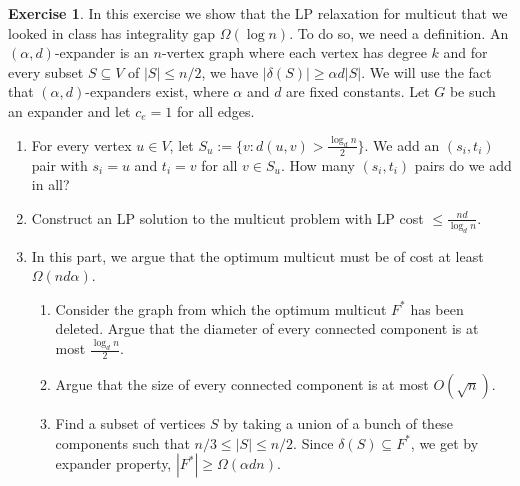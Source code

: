 \documentclass[11pt]{article}
\theoremstyle{definition}
\newtheorem{exercise}{Exercise}
\begin{document}
\begin{exercise}
In this exercise we show that the LP relaxation for multicut that we looked in class has integrality gap $\Omega(\log n)$.
To do so, we need a definition. An $(\alpha,d)$-expander is an $n$-vertex graph where each vertex has degree $k$ and for every subset $S\subseteq V$ of $|S|\leq n/2$, we have $|\delta(S)| \geq \alpha d |S|$. We will use the fact that $(\alpha,d)$-expanders exist, where $\alpha$ and $d$ are fixed constants. Let $G$ be such an expander and let $c_e = 1$ for all edges.

\begin{enumerate}
\item For every vertex $u\in V$, let $S_u := \{v: d(u,v) > \frac{\log_d n}{2}\}$. We add an $(s_i,t_i)$ pair with $s_i = u$ and $t_i = v$ for all $v \in S_u$. How many $(s_i,t_i)$ pairs do we add in all?
\item Construct an LP solution to the multicut problem with LP cost  $\leq \frac{nd}{\log_d n}$.
\item In this part, we argue that the optimum multicut must be of cost at least $\Omega(nd\alpha)$. 
\begin{enumerate}
\item Consider the graph from which the optimum multicut $F^*$ has been deleted. 
Argue that the diameter of every connected component is at most $\frac{\log_d n}{2}$.
\item Argue that the size of every connected component is at most $O(\sqrt{n})$.
\item Find a subset of vertices $S$ by taking a union of a bunch of these components such that
$n/3 \leq |S|\leq n/2$. Since $\delta(S) \subseteq F^*$, we get by expander property, $|F^*| \geq \Omega(\alpha d n)$.
\end{enumerate}


\end{enumerate}
\end{exercise}
\end{document}

